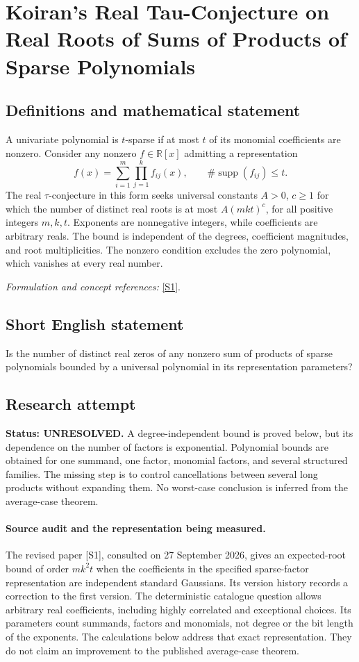 \documentclass[11pt]{article}
\begin{document}
\section*{\texorpdfstring{Koiran's Real Tau-Conjecture on Real Roots of Sums of Products of Sparse Polynomials}{Koiran's Real Tau-Conjecture on Real Roots of Sums of Products of Sparse Polynomials}}\label{340}
\subsection{Definitions and mathematical statement}
A univariate polynomial is $t$-sparse if at most $t$ of its monomial coefficients are nonzero. Consider any nonzero $f\in{\mathbb{R}}[x]$ admitting a representation
\[
 f(x)=\sum_{i=1}^{m}\prod_{j=1}^{k}f_{ij}(x),
 \qquad \#\operatorname{supp}(f_{ij})\le t.
\]
The real $\tau$-conjecture in this form seeks universal constants $A>0$, $c\ge1$ for which the number of distinct real roots is at most $A(mkt)^c$, for all positive integers $m,k,t$. Exponents are nonnegative integers, while coefficients are arbitrary reals. The bound is independent of the degrees, coefficient magnitudes, and root multiplicities. The nonzero condition excludes the zero polynomial, which vanishes at every real number.
\par\smallskip\textit{Formulation and concept references:} \href{https://arxiv.org/pdf/1806.00417}{[S1]}.

\subsection{Short English statement}
Is the number of distinct real zeros of any nonzero sum of products of sparse polynomials bounded by a universal polynomial in its representation parameters?
\subsection{Research attempt}
\textbf{Status: UNRESOLVED.} A degree-independent bound is proved below, but its dependence on the number of factors is exponential. Polynomial bounds are obtained for one summand, one factor, monomial factors, and several structured families. The missing step is to control cancellations between several long products without expanding them. No worst-case conclusion is inferred from the average-case theorem.

\paragraph{Source audit and the representation being measured.}
The revised paper [S1], consulted on 27 September 2026, gives an expected-root bound of order $mk^2t$ when the coefficients in the specified sparse-factor representation are independent standard Gaussians. Its version history records a correction to the first version. The deterministic catalogue question allows arbitrary real coefficients, including highly correlated and exceptional choices. Its parameters count summands, factors and monomials, not degree or the bit length of the exponents. The calculations below address that exact representation. They do not claim an improvement to the published average-case theorem.
\end{document}
